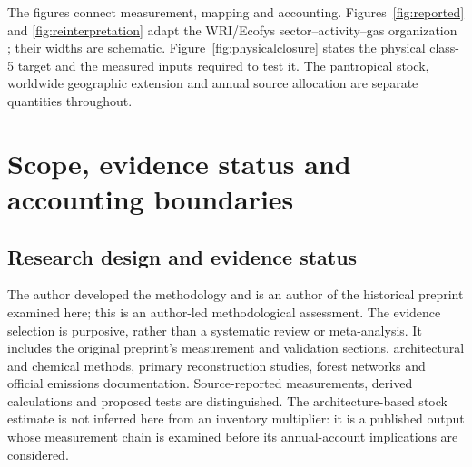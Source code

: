 \documentclass[11pt,a4paper]{article}
\theoremstyle{remark}
\begin{document}
The figures connect measurement, mapping and accounting. Figures~\ref{fig:reported} and \ref{fig:reinterpretation} adapt the WRI/Ecofys sector--activity--gas organization \citep{WRI2005,Ecofys2013}; their widths are schematic. Figure~\ref{fig:physicalclosure} states the physical class-5 target and the measured inputs required to test it. The pantropical stock, worldwide geographic extension and annual source allocation are separate quantities throughout.

\begin{center}
\end{center}

\section{Scope, evidence status and accounting boundaries}
\subsection{Research design and evidence status}
The author developed the methodology and is an author of the historical preprint examined here; this is an author-led methodological assessment. The evidence selection is purposive, rather than a systematic review or meta-analysis. It includes the original preprint's measurement and validation sections, architectural and chemical methods, primary reconstruction studies, forest networks and official emissions documentation. Source-reported measurements, derived calculations and proposed tests are distinguished. The architecture-based stock estimate is not inferred here from an inventory multiplier: it is a published output whose measurement chain is examined before its annual-account implications are considered.
\end{document}
